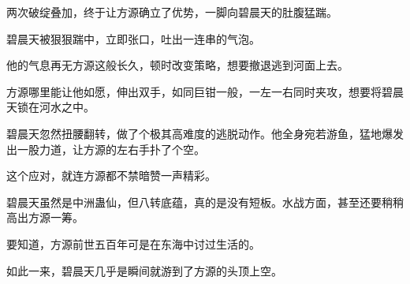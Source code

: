 \begin{this_body}
两次破绽叠加，终于让方源确立了优势，一脚向碧晨天的肚腹猛踹。

碧晨天被狠狠踹中，立即张口，吐出一连串的气泡。

他的气息再无方源这般长久，顿时改变策略，想要撤退逃到河面上去。

方源哪里能让他如愿，伸出双手，如同巨钳一般，一左一右同时夹攻，想要将碧晨天锁在河水之中。

碧晨天忽然扭腰翻转，做了个极其高难度的逃脱动作。他全身宛若游鱼，猛地爆发出一股力道，让方源的左右手扑了个空。

这个应对，就连方源都不禁暗赞一声精彩。

碧晨天虽然是中洲蛊仙，但八转底蕴，真的是没有短板。水战方面，甚至还要稍稍高出方源一筹。

要知道，方源前世五百年可是在东海中讨过生活的。

如此一来，碧晨天几乎是瞬间就游到了方源的头顶上空。

\end{this_body}


